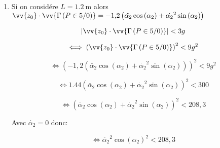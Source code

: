 \documentclass[article,11pt]{article}
\newcommand{\eqencld}[1]{
    \begin{equation*}#1\end{equation*}
}
\newcommand{\bgp}[1]{
    \left(#1\right)
}
\newcommand{\fabs}[1]{
    \left|#1\right|
}
\begin{document}
\begin{enumerate}
\item Si on considére $L=\SI{1,2}{\meter}$ alors $\vv{z_{0}}\cdot\vv{\Gamma\bgp{P\in5/0}}=-1{,}2\bgp{\ddot{\alpha_{2}}\cos\bgp{\alpha_{2}}+\dot{\alpha_{2}}^{2}\sin\bgp{\alpha_{2}}}$
\eqencld{\fabs{\vv{z_{0}}\cdot\vv{\Gamma\bgp{P\in5/0}}}<3g}
\eqencld{\iff\bgp{\vv{z_{0}}\cdot\vv{\Gamma\bgp{P\in5/0}}}^{2}<9g^{2}}
\eqencld{\iff\bgp{-1{,}2\bgp{\ddot{\alpha_{2}}\cos\bgp{\alpha_{2}}+\dot{\alpha_{2}}^{2}\sin\bgp{\alpha_{2}}}}^{2}<9g^{2}}
\eqencld{\iff1.44\bgp{\ddot{\alpha_{2}}\cos\bgp{\alpha_{2}}+\dot{\alpha_{2}}^{2}\sin\bgp{\alpha_{2}}}^{2}<300}
\eqencld{\iff\bgp{\ddot{\alpha_{2}}\cos\bgp{\alpha_{2}}+\dot{\alpha_{2}}^{2}\sin\bgp{\alpha_{2}}}^{2}<208{,}3}
Avec $\dot{\alpha_{2}}=0$ donc:
\eqencld{\iff\ddot{\alpha_{2}}^{2}\cos\bgp{\alpha_{2}}^{2}<208{,}3}
\end{enumerate}
\end{document}
